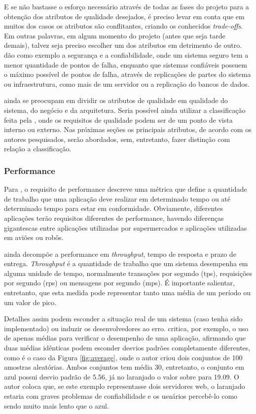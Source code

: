 \documentclass[diss]{template/setrem}
\begin{document}
E se não bastasse o esforço necessário através de todas as fases do projeto para a obtenção dos atributos de qualidade desejados, é preciso levar em conta que em muitos dos casos os atributos são conflitantes, criando os conhecidos \emph{trade-offs}. Em outras palavras, em algum momento do projeto (antes que seja tarde demais), talvez seja preciso escolher um dos atributos em detrimento de outro. \citet{Bass2003} dão como exemplo a segurança e a confiabilidade, onde um sistema seguro tem a menor quantidade de pontos de falha, enquanto que sistemas confiáveis possuem o máximo possível de pontos de falha, através de replicações de partes do sistema ou infraestrutura, como mais de um servidor ou a replicação do bancos de dados.

\citet{Bass2003} ainda se preocupam em dividir os atributos de qualidade em qualidade do sistema, do negócio e da arquitetura. Seria possível ainda utilizar a classificação feita pela \citet{Abnt2003}, onde os requisitos de qualidade podem ser de um ponto de vista interno ou externo. Nas próximas seções os principais atributos, de acordo com os autores pesquisados, serão abordados, sem, entretanto, fazer distinção com relação a classificação.

\subsubsection{Performance}
Para \citet{Gorton2011}, o requisito de performance descreve uma métrica que define a quantidade de trabalho que uma aplicação deve realizar em determinado tempo ou até determinado tempo para estar em conformidade. Obviamente, diferentes aplicações terão requisitos diferentes de performance, havendo diferenças gigantescas entre aplicações utilizadas por supermercados e aplicações utilizadas em aviões ou robôs.

\citet{Gorton2011} ainda decompõe a performance em \emph{throughput}, tempo de resposta e prazo de entrega. \emph{Throughput} é a quantidade de trabalho que um sistema desempenha em alguma unidade de tempo, normalmente transações por segundo (tps), requisições por segundo (rps) ou mensagens por segundo (mps). É importante salientar, entretanto, que esta medida pode representar tanto uma média de um período ou um valor de pico.

Detalhes assim podem esconder a situação real de um sistema (caso tenha sido implementado) ou induzir os desenvolvedores ao erro. \citet{Shaw2012} critica, por exemplo, o uso de apenas médias para verificar o desempenho de uma aplicação, afirmando que duas médias idênticas podem esconder desvios padrões completamente diferentes, como é o caso da Figura \ref{fig:average}, onde o autor criou dois conjuntos de 100 amostras aleatórias. Ambos conjuntos tem média 30, entretanto, o conjunto em azul possui desvio padrão de 5.56, já no laranjado o valor sobre para 19.09. O autor coloca que, se este exemplo representasse dois servidores web, o laranjado estaria com graves problemas de confiabilidade e os usuários percebê-lo como sendo muito mais lento que o azul. 
\end{document}
